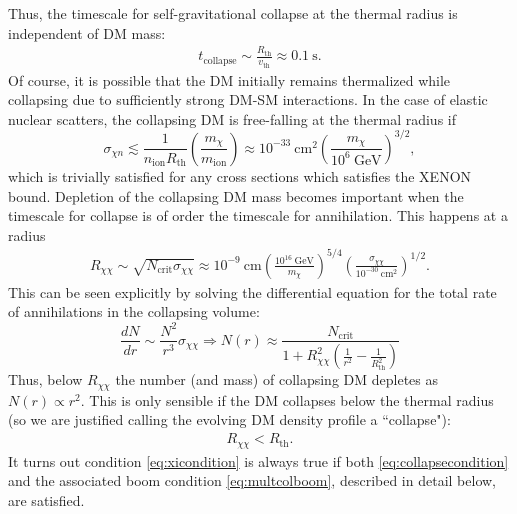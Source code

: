 \documentclass[preprintnumbers,amsmath,amssymb,prd,superscriptaddress]{revtex4}
\newcommand{\GeV}{\text{GeV}}
\newcommand{\cm}{\text{cm}}
\def\r{\right)}
\def\l{\left(}
\begin{document}
Thus, the timescale for self-gravitational collapse at the thermal radius is independent of DM mass:
\begin{align}
\label{eq:collapsetime}
  t_\text{collapse} \sim \frac{R_\text{th}}{v_\text{th}} \approx 0.1 ~\text{s}.
\end{align}
Of course, it is possible that the DM initially remains thermalized while collapsing due to sufficiently strong DM-SM interactions. 
In the case of elastic nuclear scatters, the collapsing DM is free-falling at the thermal radius if
\begin{equation}
\sigma_{\chi n} \lesssim \frac{1}{n_\text{ion} R_\text{th}} \l \frac{m_\chi}{m_\text{ion}}\r \approx 10^{-33} ~\cm^2 \l \frac{m_\chi}{10^6 ~\GeV} \r^{3/2},
\end{equation}
which is trivially satisfied for any cross sections which satisfies the XENON bound. 
Depletion of the collapsing DM mass becomes important when the timescale for collapse is of order the timescale for annihilation.
This happens at a radius
\begin{align}
R_{\chi \chi} \sim \sqrt{N_\text{crit} \sigma_{\chi \chi}} \approx 10^{-9} ~\cm  \l \frac{10^{16} ~\GeV}{m_\chi} \r^{5/4} \l \frac{\sigma_{\chi \chi}}{10^{-30} ~\cm^2} \r^{1/2}. 
\end{align}
This can be seen explicitly by solving the differential equation for the total rate of annihilations in the collapsing volume:
\begin{equation}
\label{eq:DMcollapsedeplete}
\frac{dN}{dr} \sim \frac{N^2}{r^3} \sigma_{\chi \chi} \Rightarrow N(r) \approx \frac{N_\text{crit}}{1+ R_{\chi \chi}^2 \l \frac{1}{r^2} -\frac{1}{R_\text{th}^2}\r}
\end{equation}
Thus, below $R_{\chi \chi}$ the number (and mass) of collapsing DM depletes as $N(r) \propto r^2$. 
This is only sensible if the DM collapses below the thermal radius (so we are justified calling the evolving DM density profile a ``collapse"):
\begin{align}
\label{eq:xicondition}
R_{\chi \chi} < R_\text{th}.
\end{align}
It turns out condition \eqref{eq:xicondition} is always true if both \eqref{eq:collapsecondition} and the associated boom condition \eqref{eq:multcolboom}, described in detail below, are satisfied. 
\end{document}
